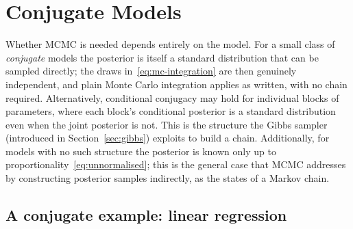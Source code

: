 \section{Conjugate Models}
\label{sec:conjugate}

Whether MCMC is needed depends entirely on the model. For a
small class of \emph{conjugate} models the posterior is itself a
standard distribution that can be sampled directly; the draws
in~\eqref{eq:mc-integration} are then genuinely independent, and plain
Monte Carlo integration applies as written, with no chain required.
Alternatively, conditional conjugacy may hold for individual blocks of parameters, where each block's conditional posterior is a standard distribution even when the joint posterior is not. This is the structure the Gibbs sampler (introduced in Section~\ref{sec:gibbs}) exploits to build a chain. Additionally, for models with no such structure the posterior is known only up to
proportionality~\eqref{eq:unnormalised}; this is the general case that MCMC
addresses by constructing posterior samples indirectly, as the states
of a Markov chain.

\subsection{A conjugate example: linear regression}
\label{sec:conj-linreg}

